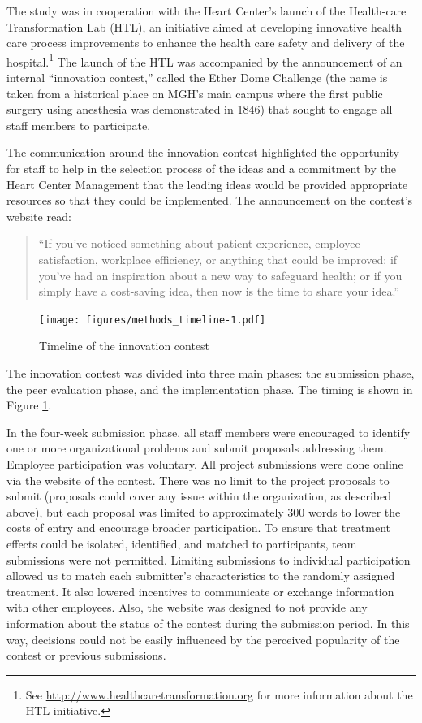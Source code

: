 \documentclass[12pt, titlepage]{article}
\begin{document}
The study was in cooperation with the Heart Center's launch of the
Health-care Transformation Lab (HTL), an initiative aimed at developing
innovative health care process improvements to enhance the health care
safety and delivery of the hospital.\footnote{See
  \url{http://www.healthcaretransformation.org} for more information
  about the HTL initiative.} The launch of the HTL was accompanied by
the announcement of an internal ``innovation contest,'' called the Ether
Dome Challenge (the name is taken from a historical place on MGH's main
campus where the first public surgery using anesthesia was demonstrated
in 1846) that sought to engage all staff members to participate.

The communication around the innovation contest highlighted the
opportunity for staff to help in the selection process of the ideas and
a commitment by the Heart Center Management that the leading ideas would
be provided appropriate resources so that they could be implemented. The
announcement on the contest's website read:

\begin{quote}
``If you've noticed something about patient experience, employee
satisfaction, workplace efficiency, or anything that could be improved;
if you've had an inspiration about a new way to safeguard health; or if
you simply have a cost-saving idea, then now is the time to share your
idea.''
\end{quote}

\begin{figure}
\centering
\caption{Timeline of the innovation contest}
\label{timeline}
\texttt{[image: figures/methods\_timeline-1.pdf]}
\end{figure}

The innovation contest was divided into three main phases: the
submission phase, the peer evaluation phase, and the implementation
phase. The timing is shown in Figure \ref{timeline}.

In the four-week submission phase, all staff members were encouraged to
identify one or more organizational problems and submit proposals
addressing them. Employee participation was voluntary. All project
submissions were done online via the website of the contest. There was
no limit to the project proposals to submit (proposals could cover any
issue within the organization, as described above), but each proposal
was limited to approximately 300 words to lower the costs of entry and
encourage broader participation. To ensure that treatment effects could
be isolated, identified, and matched to participants, team submissions
were not permitted. Limiting submissions to individual participation
allowed us to match each submitter's characteristics to the randomly
assigned treatment. It also lowered incentives to communicate or
exchange information with other employees. Also, the website was
designed to not provide any information about the status of the contest
during the submission period. In this way, decisions could not be easily
influenced by the perceived popularity of the contest or previous
submissions.
\end{document}
